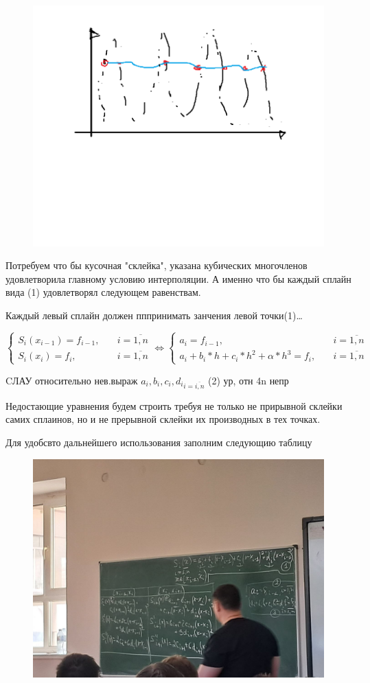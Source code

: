 \documentclass{article}
\begin{document}
\begin{figure} [H]
    \includegraphics[width=0.70\linewidth]{Без имени7.png}
\end{figure}


Потребуем что бы кусочная "склейка", указана кубических многочленов удовлетворила главному
условию интерполяции. А именно что бы каждый сплайн вида (1) удовлетворял следующем
равенствам.

Каждый левый сплайн должен пппринимать занчения левой точки(1)\dots

$$
\begin{cases}
    S_i (x_{i-1}) = f_{i-1}, & \quad i = \overline{1, n}  \\
    S_i (x_i) = f_i, & \quad i = \overline{1, n}
\end{cases}
\Leftrightarrow
\begin{cases}
    a_i = f_{i-1}, & \quad i = \overline{1, n}  \\
    a_i + b_i * h + c_i * h^2 + \alpha * h^3 = f_i, & \quad i = \overline{1, n}
\end{cases}
$$

CЛАУ относительно нев.выраж ${a_i,b_i,c_i,d_i}_{i= \overline{i,n}}$ (2) ур, отн 4n непр


Недостающие уравнения будем строить требуя не только не прирывной склейки самих  сплаинов, 
но и не прерывной склейки их производных в тех точках.

Для удобсвто дальнейшего использования заполним следующию таблицу
\begin{figure} [H]
    \includegraphics[width=0.70\linewidth]{photo_5375068150250467856_y.jpg}
\end{figure}
\end{document}
